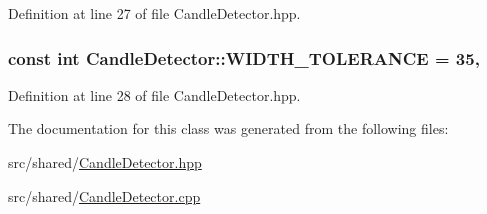 Definition at line 27 of file Candle\-Detector.\-hpp.

\hypertarget{classCandleDetector_a1c8f0232491ba37dd10032c1da376145}{
\subsubsection[{W\-I\-D\-T\-H\-\_\-\-T\-O\-L\-E\-R\-A\-N\-C\-E}]{\setlength{\rightskip}{0pt plus 5cm}const int Candle\-Detector\-::\-W\-I\-D\-T\-H\-\_\-\-T\-O\-L\-E\-R\-A\-N\-C\-E = 35\hspace{0.3cm}{\ttfamily [static]}, {\ttfamily [private]}}}\label{classCandleDetector_a1c8f0232491ba37dd10032c1da376145}


Definition at line 28 of file Candle\-Detector.\-hpp.



The documentation for this class was generated from the following files\-:\begin{DoxyCompactItemize}
\item 
src/shared/\hyperlink{CandleDetector_8hpp}{Candle\-Detector.\-hpp}\item 
src/shared/\hyperlink{CandleDetector_8cpp}{Candle\-Detector.\-cpp}\end{DoxyCompactItemize}
